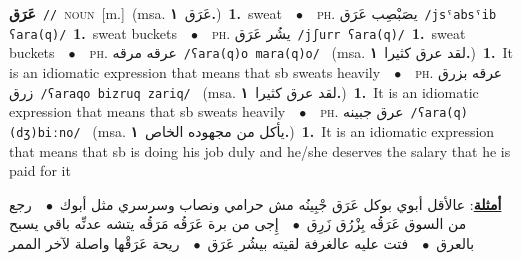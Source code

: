 \documentclass[10pt,a4paper,twoside]{article} %
\begin{document}
\begin{multicols}{2}
{\setlength\topsep{0pt}\textbf{\foreignlanguage{arabic}{عَرَق}}\ {\color{gray}\texttt{//}\color{black}}\ \textsc{noun}\ [m.]\ \color{gray}(msa. \foreignlanguage{arabic}{عَرَق}~\foreignlanguage{arabic}{\textbf{١.}})\color{black}\ \textbf{1.}~sweat\ \ $\bullet$\ \ \textsc{ph.} \color{gray} \foreignlanguage{arabic}{يصَبْصِب عَرَق}\color{black}\ {\color{gray}\texttt{/{\sffamily jsˤabsˤib ʕara(q)}/}\color{black}}\ \textbf{1.}~sweat buckets\ \ $\bullet$\ \ \textsc{ph.} \color{gray} \foreignlanguage{arabic}{يشُر عَرَق}\color{black}\ {\color{gray}\texttt{/{\sffamily jʃurr ʕara(q)}/}\color{black}}\ \textbf{1.}~sweat buckets\ \ $\bullet$\ \ \textsc{ph.} \color{gray} \foreignlanguage{arabic}{عرقه مرقه}\color{black}\ {\color{gray}\texttt{/{\sffamily ʕara(q)o mara(q)o}/}\color{black}}\ \color{gray} (msa. \foreignlanguage{arabic}{لقد عرق كثيرا}~\foreignlanguage{arabic}{\textbf{١.}})\color{black}\ \textbf{1.}~It is an idiomatic expression that means that sb sweats heavily\ \ $\bullet$\ \ \textsc{ph.} \color{gray} \foreignlanguage{arabic}{عرقه بزرق زرق}\color{black}\ {\color{gray}\texttt{/{\sffamily ʕaraqo bizruq zariq}/}\color{black}}\ \color{gray} (msa. \foreignlanguage{arabic}{لقد عرق كثيرا}~\foreignlanguage{arabic}{\textbf{١.}})\color{black}\ \textbf{1.}~It is an idiomatic expression that means that sb sweats heavily\ \ $\bullet$\ \ \textsc{ph.} \color{gray} \foreignlanguage{arabic}{عرق جبينه}\color{black}\ {\color{gray}\texttt{/{\sffamily ʕara(q) (dʒ)biːno}/}\color{black}}\ \color{gray} (msa. \foreignlanguage{arabic}{يأكل من مجهوده الخاص}~\foreignlanguage{arabic}{\textbf{١.}})\color{black}\ \textbf{1.}~It is an idiomatic expression that means that sb is doing his job duly and he/she deserves the salary that he is paid for it\  \begin{flushright}\color{gray}\foreignlanguage{arabic}{\textbf{\underline{\foreignlanguage{arabic}{أمثلة}}}: عالأقل أبوي بوكل عَرَق جْبِينُه مش حرامي ونصاب وسرسري مثل أبوك\ $\bullet$\ \  رجع من السوق عَرَقُه بِزْرُق زَرِق\ $\bullet$\ \  إِجى من برة عَرَقُه مَرَقُه يتشه عدنِّه باقي يسبح بالعرق\ $\bullet$\ \  فتت عليه عالغرفة لقيته بيشُر عَرَق\ $\bullet$\ \  ريحة عَرَقْها واصلة لآخر الممر}\end{flushright}\color{black}} \vspace{2mm}


\end{multicols}
\end{document}
